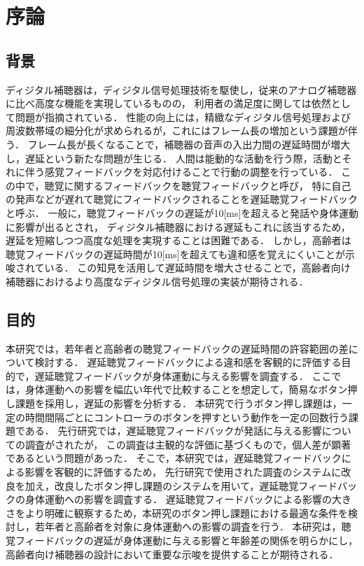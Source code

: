 \section{序論}
\subsection{背景}
ディジタル補聴器は，ディジタル信号処理技術を駆使し，従来のアナログ補聴器に比べ高度な機能を実現しているものの，
利用者の満足度に関しては依然として問題が指摘されている\cite{cf:Manzokudo}．
性能の向上には，精緻なディジタル信号処理および周波数帯域の細分化が求められるが，これにはフレーム長の増加という課題が伴う．
フレーム長が長くなることで，補聴器の音声の入出力間の遅延時間が増大し，遅延という新たな問題が生じる．
人間は能動的な活動を行う際，活動とそれに伴う感覚フィードバックを対応付けることで行動の調整を行っている．
この中で，聴覚に関するフィードバックを聴覚フィードバックと呼び，
特に自己の発声などが遅れて聴覚にフィードバックされることを遅延聴覚フィードバックと呼ぶ\cite{cf:DAF}．
一般に，聴覚フィードバックの遅延が10[ms]を超えると発話や身体運動に影響が出るとされ\cite{cf:DelayTime-ninnchi}，
ディジタル補聴器における遅延もこれに該当するため，遅延を短縮しつつ高度な処理を実現することは困難である．
しかし，高齢者は聴覚フィードバックの遅延時間が10[ms]を超えても違和感を覚えにくいことが示唆されている\cite{shigematu-toukyoushibu}．
この知見を活用して遅延時間を増大させることで，高齢者向け補聴器におけるより高度なディジタル信号処理の実装が期待される．
\subsection{目的}
本研究では，若年者と高齢者の聴覚フィードバックの遅延時間の許容範囲の差について検討する．
遅延聴覚フィードバックによる違和感を客観的に評価する目的で，遅延聴覚フィードバックが身体運動に与える影響を調査する．
ここでは，身体運動への影響を幅広い年代で比較することを想定して，簡易なボタン押し課題を採用し，遅延の影響を分析する．
本研究で行うボタン押し課題は，一定の時間間隔ごとにコントローラのボタンを押すという動作を一定の回数行う課題である．
先行研究\cite{cf:kayama}では，遅延聴覚フィードバックが発話に与える影響についての調査がされたが，
この調査は主観的な評価に基づくもので，個人差が顕著であるという問題があった．
そこで，本研究では，遅延聴覚フィードバックによる影響を客観的に評価するため，
先行研究\cite{cf:shigematu}で使用された調査のシステムに改良を加え，改良したボタン押し課題のシステムを用いて，遅延聴覚フィードバックの身体運動への影響を調査する．
遅延聴覚フィードバックによる影響の大きさをより明確に観察するため，本研究のボタン押し課題における最適な条件を検討し，若年者と高齢者を対象に身体運動への影響の調査を行う．
本研究は，聴覚フィードバックの遅延が身体運動に与える影響と年齢差の関係を明らかにし，
高齢者向け補聴器の設計において重要な示唆を提供することが期待される．